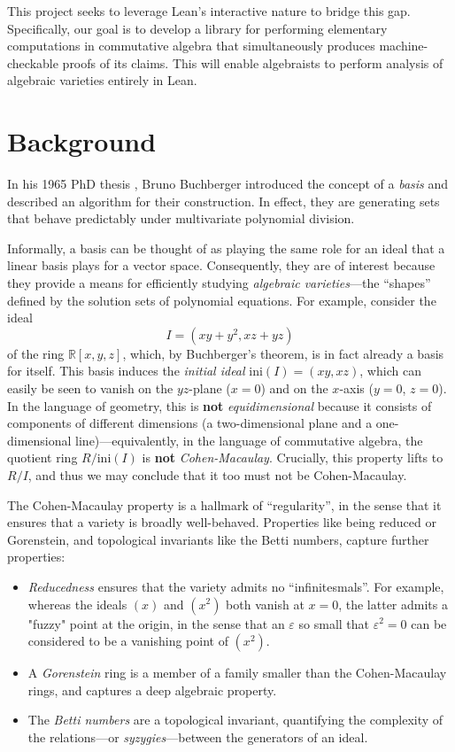 \documentclass[acmsmall,nonacm,screen]{acmart}
\begin{document}
This project seeks to leverage Lean's interactive nature to bridge this gap.
Specifically, our goal is to develop a library for performing elementary computations in commutative algebra that simultaneously produces machine-checkable proofs of its claims.
This will enable algebraists to perform analysis of algebraic varieties entirely in Lean.

\section{Background}

In his 1965 PhD thesis \cite{Buchberger1965}, Bruno Buchberger introduced the concept of a {\it \Groebner{} basis} and described an algorithm for their construction.
In effect, they are generating sets that behave predictably under multivariate polynomial division.

Informally, a \Groebner{} basis can be thought of as playing the same role for an ideal that a linear basis plays for a vector space.
Consequently, they are of interest because they provide a means for efficiently studying {\it algebraic varieties}---the ``shapes'' defined by the solution sets of polynomial equations.
For example, consider the ideal
$$
  I = (xy + y^2, xz + yz)
$$
of the ring $\mathbb{R}[x, y, z]$, which, by Buchberger's theorem, is in fact already a \Groebner{} basis for itself.
This basis induces the {\it initial ideal} $\mathrm{ini}(I) = (x y, x z)$, which can easily be seen to vanish on the $yz$-plane ($x = 0$) and on the $x$-axis ($y = 0$, $z = 0$).
In the language of geometry, this is {\bf not} {\it equidimensional} because it consists of components of different dimensions (a two-dimensional plane and a one-dimensional line)---equivalently, in the language of commutative algebra, the quotient ring $R/\mathrm{ini}(I)$ is {\bf not} {\it Cohen-Macaulay}.
Crucially, this property lifts to $R/I$, and thus we may conclude that it too must not be Cohen-Macaulay.

The Cohen-Macaulay property is a hallmark of ``regularity'', in the sense that it ensures that a variety is broadly well-behaved.
Properties like being reduced or Gorenstein, and topological invariants like the Betti numbers, capture further properties:

\begin{itemize}
\item
{\it Reducedness} ensures that the variety admits no ``infinitesmals''. For example, whereas the ideals $(x)$ and $(x^2)$ both vanish at $x = 0$, the latter admits a "fuzzy" point at the origin, in the sense that an $\varepsilon$ so small that $\varepsilon^2 = 0$ can be considered to be a vanishing point of $(x^2)$.
\item
A {\it Gorenstein} ring is a member of a family smaller than the Cohen-Macaulay rings, and captures a deep algebraic property.
\item
The {\it Betti numbers} are a topological invariant, quantifying the complexity of the relations---or {\it syzygies}---between the generators of an ideal.
\end{itemize}
\end{document}
